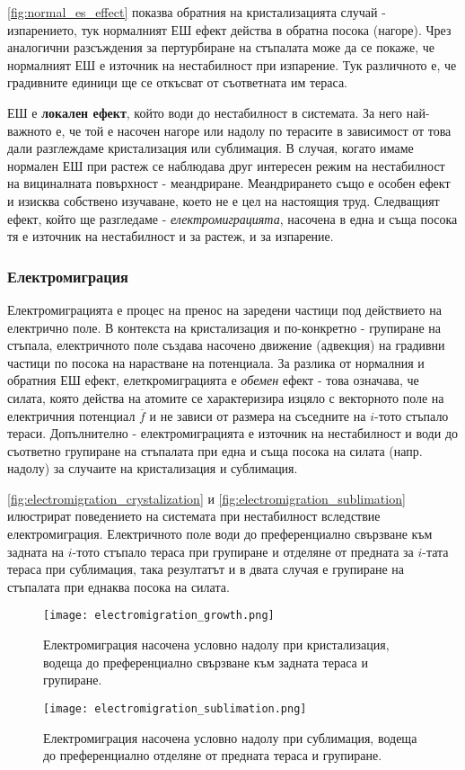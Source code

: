 \autoref{fig:normal_es_effect} показва обратния на кристализацията случай - изпарението, тук нормалният ЕШ ефект действа в обратна посока (нагоре). Чрез аналогични разсъждения за пертурбиране на стъпалата може да се покаже, че нормалният ЕШ е източник на нестабилност при изпарение. Тук различното е, че градивните единици ще се откъсват от съответната им тераса.

ЕШ е \textbf{локален ефект}, който води до нестабилност в системата. За него най-важното е, че той е насочен нагоре или надолу по терасите в зависимост от това дали разглеждаме кристализация или сублимация.  В случая, когато имаме нормален ЕШ при растеж се наблюдава друг интересен режим на нестабилност на вициналната повърхност - меандриране. Меандрирането също е особен ефект и изисква собствено изучаване, което не е цел на настоящия труд. \cite{Krug2005} Следващият ефект, който ще разгледаме - \textit{електромиграцията}, насочена в една и съща посока тя е източник на нестабилност и за растеж, и за изпарение.

\subsubsection{Електромиграция}
Електромиграцията е процес на пренос на заредени частици под действието на електрично поле. В контекста на кристализация и по-конкретно - групиране на стъпала, електричното поле създава насочено движение (адвекция) на градивни частици по посока на нарастване на потенциала.
За разлика от нормалния и обратния ЕШ ефект, елеткромиграцията е \textit{обемен} ефект - това означава, че силата, която действа на атомите се характеризира изцяло с векторното поле на електричния потенциал $\overline{f}$ и не зависи от размера на съседните на $i$-тото стъпало тераси. Допълнително - електромиграцията е източник на нестабилност и води до съответно групиране на стъпалата при една и съща посока на силата (напр. надолу) за случаите на кристализация и сублимация.

\autoref{fig:electromigration_crystalization} и \autoref{fig:electromigration_sublimation} илюстрират поведението на системата при нестабилност вследствие електромиграция. Електричното поле води до преференциално свързване към задната на $i$-тото стъпало тераса при групиране и отделяне от предната за $i$-тата тераса при сублимация, така резултатът и в двата случая е групиране на стъпалата при еднаква посока на силата.
\begin{figure}[htbp]
	\centering
	\texttt{[image: electromigration\_growth.png]}
	\caption{Електромиграция насочена условно надолу при кристализация, водеща до преференциално свързване към задната тераса и групиране.}
	\label{fig:electromigration_crystalization}
\end{figure}
\begin{figure}[htbp]
	\centering
	\texttt{[image: electromigration\_sublimation.png]}
	\caption{Електромиграция насочена условно надолу при сублимация, водеща до преференциално отделяне от предната тераса и групиране.}
	\label{fig:electromigration_sublimation}
\end{figure}

